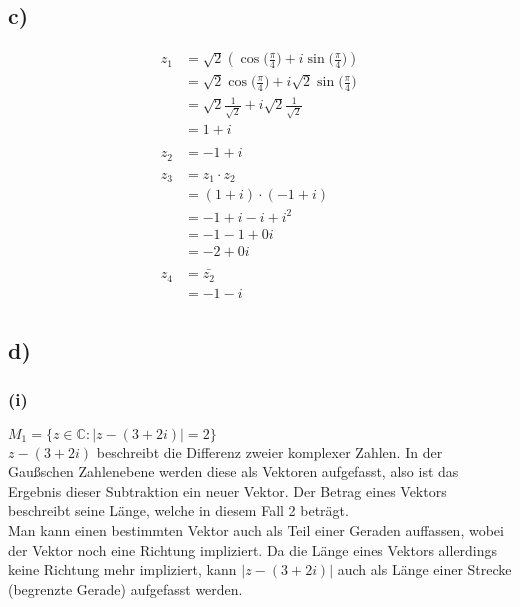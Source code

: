 \documentclass[a4paper]{scrartcl}
\begin{document}
\newpage
\subsection{c)}
\begin{align}
z_1&=\sqrt{2}(\cos\big(\frac{\pi}{4}\big)+i\sin\big(\frac{\pi}{4}\big)) \\
	&=\sqrt{2}\cos\big(\frac{\pi}{4}\big)+i\sqrt{2}\sin\big(\frac{\pi}{4}\big) \\
	&=\sqrt{2}\frac{1}{\sqrt{2}}+i\sqrt{2}\frac{1}{\sqrt{2}} \\
	&=1+i \\ \\
z_2&=-1+i \\ \\
z_3&=z_1\cdot z_2 \\
	&=(1+i)\cdot(-1+i) \\
	&=-1+i-i+i^2 \\
	&=-1-1+0i \\
	&=-2+0i \\ \\
z_4&=\bar{z_2} \\ 
	&=-1-i \\
\end{align}
\begin{center}
\end{center}
\newpage
\subsection{d)}
\subsubsection{(i)}
\(M_1=\Big\{z\in\mathbb{C}:|z-(3+2i)|=2 \Big\}\) \\
\(z-(3+2i)\) beschreibt die Differenz zweier komplexer Zahlen. In der Gaußschen Zahlenebene werden diese als Vektoren aufgefasst, also ist das Ergebnis dieser Subtraktion ein neuer Vektor.
Der Betrag eines Vektors beschreibt seine Länge, welche in diesem Fall 2 beträgt. \\
Man kann einen bestimmten Vektor auch als Teil einer Geraden auffassen, wobei der Vektor noch eine Richtung impliziert. Da die Länge eines Vektors allerdings keine Richtung mehr impliziert, kann \(|z-(3+2i)|\) auch als Länge einer Strecke (begrenzte Gerade) aufgefasst werden.
\end{document}
